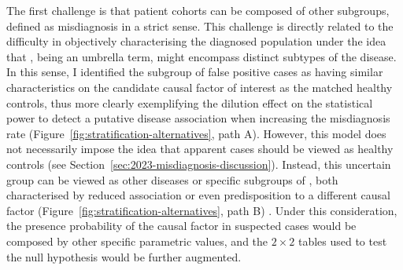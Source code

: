 The first challenge is that \cfs patient cohorts can be composed of other subgroups, defined as misdiagnosis in a strict sense.
This challenge is directly related to the difficulty in objectively characterising the diagnosed population under the idea that \cfs, being an umbrella term, might encompass distinct subtypes of the disease.
In this sense, I identified the subgroup of false positive cases as having similar characteristics on the candidate causal factor of interest as the matched healthy controls, thus more clearly exemplifying the dilution effect on the statistical power to detect a putative disease association when increasing the misdiagnosis rate (Figure~\ref{fig:stratification-alternatives}, path A).
However, this model does not necessarily impose the idea that apparent cases should be viewed as healthy controls (see Section~\ref{sec:2023-misdiagnosis-discussion}).
Instead, this uncertain group can be viewed as other diseases or specific subgroups of \cfs, both characterised by reduced association or even predisposition to a different causal factor (Figure~\ref{fig:stratification-alternatives}, path B) \citep{nacul2019HowHave}.
Under this consideration, the presence probability of the causal factor in suspected \cfs cases would be composed by other specific parametric values, and the $2 \times 2$ tables used to test the null hypothesis would be further augmented.

